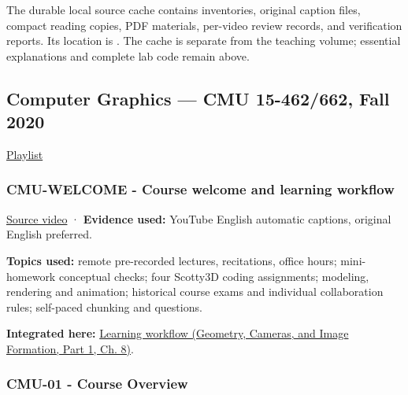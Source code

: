The durable local source cache contains inventories, original caption files, compact reading copies, PDF materials, per-video review records, and verification reports. Its location is . The cache is separate from the teaching volume; essential explanations and complete lab code remain above.

\subsection{Computer Graphics --- CMU 15-462/662, Fall 2020}\label{04-visual-computing-ii-ch036-computer-graphics-cmu-15-462662-fall-2020}

\hypertarget{04-visual-computing-ii-ch036-computer-graphics-cmu-15-462662-fall-2020}{}

\href{https://www.youtube.com/playlist?list=PL9_jI1bdZmz2emSh0UQ5iOdT2xRHFHL7E}{Playlist}

\subsubsection{CMU-WELCOME - Course welcome and learning workflow}\label{04-visual-computing-ii-ch036-cmu-welcome---course-welcome-and-learning-workflow}

\hypertarget{04-visual-computing-ii-ch036-cmu-welcome---course-welcome-and-learning-workflow}{}

\href{https://www.youtube.com/watch?v=W6yEALqsD7k}{Source video} · \textbf{Evidence used:} YouTube English automatic captions, original English preferred.

\textbf{Topics used:} remote pre-recorded lectures, recitations, office hours; mini-homework conceptual checks; four Scotty3D coding assignments; modeling, rendering and animation; historical course exams and individual collaboration rules; self-paced chunking and questions.

\textbf{Integrated here:} \href{../03-Geometry-Cameras-and-Image-Formation-P01/main.pdf\#03-visual-computing-i-ch001-how-to-use-this-volume-without-losing-the-thread}{Learning workflow (Geometry, Cameras, and Image Formation, Part 1, Ch. 8)}.

\subsubsection{CMU-01 - Course Overview}\label{04-visual-computing-ii-ch036-cmu-01---course-overview}

